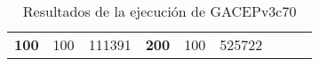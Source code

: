 \begin{table}[H]
\begin{tabular}{|ccrccrccc}
\multicolumn{1}{|c|}{\multirow{-39}{*}{\cellcolor[HTML]{FFFFC7}\textbf{100}}} & \multicolumn{1}{c|}{\multirow{-9}{*}{\cellcolor[HTML]{DDFDFF}100}} & \multicolumn{1}{r|}{\cellcolor[HTML]{DAE8FC}111391}    & \multicolumn{1}{c|}{\multirow{-39}{*}{\cellcolor[HTML]{FFFFC7}\textbf{200}}} & \multicolumn{1}{c|}{\multirow{-10}{*}{\cellcolor[HTML]{DDFDFF}100}} & \multicolumn{1}{r|}{\cellcolor[HTML]{DDFDFF}525722}    &                                                                              &                                                                    &                                                        \\ \cline{1-6}
\end{tabular}
\caption{\label{GACEPv3c70GRASP}Resultados de la ejecución de GACEPv3c70}
\end{table}

